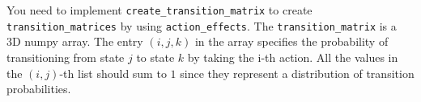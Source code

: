 \documentclass[12pt]{article}
\begin{document}
You need to implement \verb+create_transition_matrix+ to create \verb+transition_matrices+ by using \verb+action_effects+.  The \verb+transition_matrix+ is a 3D numpy array. The entry $(i,j,k)$ in the array specifies the probability of transitioning from state $j$ to state $k$ by taking the i-th action. All the values in the $(i,j)$-th list should sum to $1$ since they represent a distribution of transition probabilities.
\end{document}
